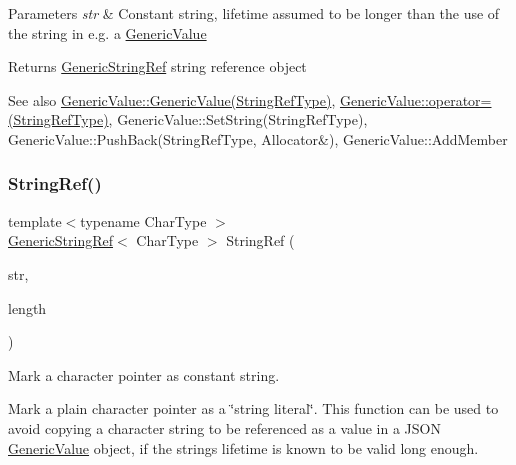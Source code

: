 \begin{DoxyParams}{Parameters}
{\em str} & Constant string, lifetime assumed to be longer than the use of the string in e.\+g. a \hyperlink{classGenericValue}{Generic\+Value} \\
\hline
\end{DoxyParams}
\begin{DoxyReturn}{Returns}
\hyperlink{structGenericStringRef}{Generic\+String\+Ref} string reference object
\end{DoxyReturn}
\begin{DoxySeeAlso}{See also}
\hyperlink{classGenericValue_abb2887958974fef1b2b5c8e32cc72ddb}{Generic\+Value\+::\+Generic\+Value(\+String\+Ref\+Type)}, \hyperlink{classGenericValue_a386708557555e6389184de608af5e6a6}{Generic\+Value\+::operator=(\+String\+Ref\+Type)}, Generic\+Value\+::\+Set\+String(\+String\+Ref\+Type), Generic\+Value\+::\+Push\+Back(\+String\+Ref\+Type, Allocator\&), Generic\+Value\+::\+Add\+Member 
\end{DoxySeeAlso}
\mbox{\label{structGenericStringRef_a578c51ab574a50a9c760b9da7c7562f2}} 
\subsubsection{\texorpdfstring{String\+Ref()}{StringRef()}\hspace{0.1cm}{\footnotesize\ttfamily [2/2]}}
{\footnotesize\ttfamily template$<$typename Char\+Type $>$ \\
\hyperlink{structGenericStringRef}{Generic\+String\+Ref}$<$ Char\+Type $>$ String\+Ref (\begin{DoxyParamCaption}\item[{const Char\+Type $\ast$}]{str,  }\item[{size\+\_\+t}]{length }\end{DoxyParamCaption})\hspace{0.3cm}{\ttfamily [related]}}



Mark a character pointer as constant string. 

Mark a plain character pointer as a \char`\"{}string literal\char`\"{}. This function can be used to avoid copying a character string to be referenced as a value in a J\+S\+ON \hyperlink{classGenericValue}{Generic\+Value} object, if the string\textquotesingle{}s lifetime is known to be valid long enough.

